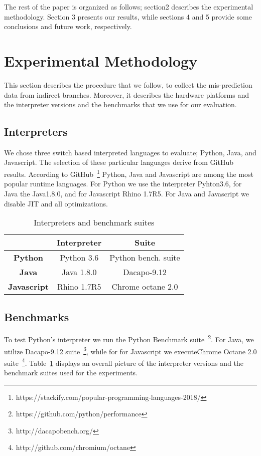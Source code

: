 \documentclass[parskip=full, paper=a4, fontsize=12pt]{scrartcl}
\numberwithin{equation}{section}
\numberwithin{figure}{section}
\numberwithin{table}{section}
\begin{document}
The rest of the paper is organized as follows; section2 describes the experimental methodology.
Section 3 presents our results, while sections 4 and 5 provide some conclusions and future work, 
respectively.  

\section{Experimental Methodology}
This section describes the procedure that we follow, to collect the mis-prediction data from indirect branches. Moreover, it describes the hardware platforms and the interpreter versions and the benchmarks that we use for our evaluation. 

\subsection{Interpreters}
We chose three switch based interpreted languages to evaluate; Python, Java, and Javascript. The selection of these particular languages derive from GitHub results. According to GitHub~\footnote{https://stackify.com/popular-programming-languages-2018/} Python, Java and Javascript are among the most popular runtime languages. For Python we use the interpreter Pyhton3.6, for Java the Java1.8.0, and for Javascript Rhino 1.7R5. For Java and Javascript we disable JIT and all optimizations. 
\begin{table}[]
	\centering
	\caption{Interpreters and benchmark suites}
	\label{inter_bench}
	\begin{tabular}{|c|c|c|}
		\hline
		\textbf{}           & \textbf{Interpreter} & \textbf{Suite}      \\ \hline
		\textbf{Python}     & Python 3.6           & Python bench. suite \\ \hline
		\textbf{Java}       & Java 1.8.0           & Dacapo-9.12         \\ \hline
		\textbf{Javascript} & Rhino 1.7R5          & Chrome octane 2.0   \\ \hline
	\end{tabular}
\end{table}

\subsection{Benchmarks} 
To test Python's interpreter we run the Python Benchmark suite~\footnote{https://github.com/python/performance}. For Java,
we utilize Dacapo-9.12 suite~\footnote{http://dacapobench.org/}, while for for Javascript we executeChrome Octane 2.0 suite~\footnote{http://github.com/chromium/octane}. Table~\ref{inter_bench} displays an overall picture of the interpreter versions and the benchmark suites used for the experiments.
\end{document}
